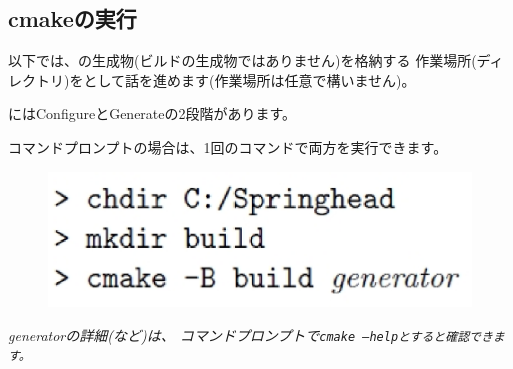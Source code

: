 \subsection{cmakeの実行}
\label{subsec:CmakeLibrary}

\noindent
以下では、\cmake の生成物(ビルドの生成物ではありません)を格納する
作業場所(ディレクトリ)を\build として話を進めます(作業場所は任意で構いません)。

\medskip
\noindent
\cmake にはConfigureとGenerateの2段階があります。

\medskip
\noindent
コマンドプロンプトの場合は、1回のコマンドで両方を実行できます。
\ifLwarp
	\begin{figure}[h]
	    \begin{center}
	    \includegraphics[width=\textwidth]{fig/command-2-3.eps}
	    \end{center}
	    \label{fig:DownloadTree}
	\end{figure}
\else
\begin{narrow}[15pt]
	\it{generatorの}詳細(など)は、
	コマンドプロンプトで\tt{cmake --help}とすると確認できます。
\end{narrow}
\fi

